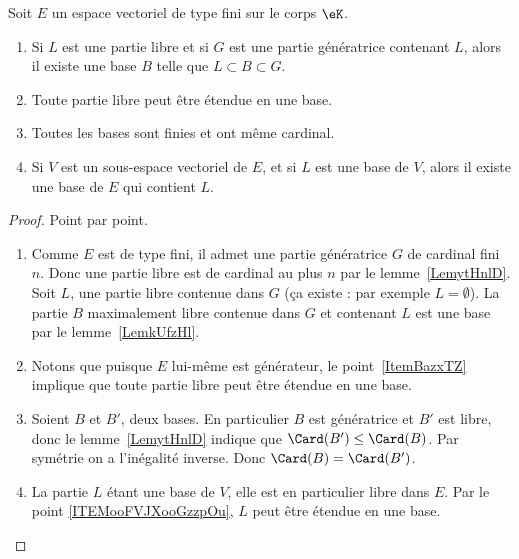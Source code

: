 \begin{theorem} \label{ThonmnWKs}
	Soit \( E\) un espace vectoriel de type fini sur le corps \( \eK\).
	\begin{enumerate}
		\item     \label{ItemBazxTZ}
		      Si \( L\) est une partie libre et si \( G\) est une partie génératrice contenant \( L\), alors il existe une base \( B\) telle que \( L\subset B\subset G\).
		\item     \label{ITEMooFVJXooGzzpOu}
		      Toute partie libre peut être étendue en une base.
		\item     \label{ITEMooFBUAooSSZxgx}
		      Toutes les bases sont finies et ont même cardinal.
		\item       \label{ITEMooJIJSooGuJMdt}
		      Si \( V\) est un sous-espace vectoriel de \( E\), et si \( L\) est une base de \( V\), alors il existe une base de \( E\) qui contient \( L\).
	\end{enumerate}
\end{theorem}

\begin{proof}
	Point par point.
	\begin{enumerate}
		\item
		      Comme \( E\) est de type fini, il admet une partie génératrice \( G\) de cardinal fini \( n\). Donc une partie libre est de cardinal au plus \( n\) par le lemme~\ref{LemytHnlD}. Soit \( L\), une partie libre contenue dans \( G\) (ça existe : par exemple \( L=\emptyset\)). La partie \( B\) maximalement libre contenue dans \( G\) et contenant \( L\) est une base par le lemme~\ref{LemkUfzHl}.
		\item
		      Notons que puisque \( E\) lui-même est générateur, le point~\ref{ItemBazxTZ} implique que toute partie libre peut être étendue en une base.
		\item
		      Soient \( B\) et \( B'\), deux bases. En particulier \( B\) est génératrice et \( B'\) est libre, donc le lemme~\ref{LemytHnlD} indique que \( \Card(B')\leq \Card(B)\). Par symétrie on a l'inégalité inverse. Donc \( \Card(B)=\Card(B')\).
		\item
		      La partie \( L\) étant une base de \( V\), elle est en particulier libre dans \( E\). Par le point \ref{ITEMooFVJXooGzzpOu}, \( L\) peut être étendue en une base.
	\end{enumerate}
\end{proof}

